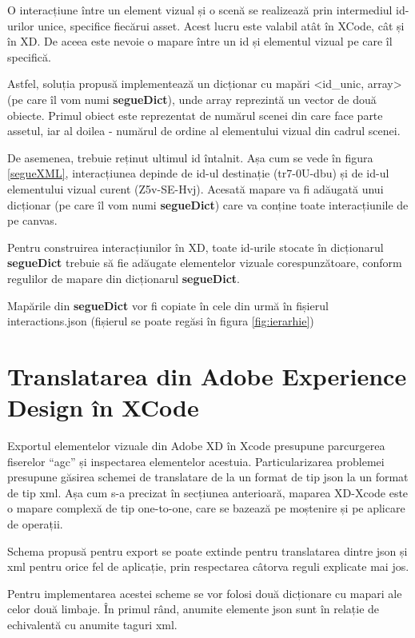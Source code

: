 O interacțiune între un element vizual și o scenă se realizează prin intermediul id-urilor unice, specifice fiecărui asset. Acest lucru este valabil atât în XCode, cât și în XD. De aceea este nevoie o mapare între un id și elementul vizual pe care îl specifică. 

Astfel, soluția propusă implementează un dicționar cu mapări <id_unic, array> (pe care îl vom numi \textbf{segueDict}), unde array reprezintă un vector de două obiecte. Primul obiect este reprezentat de numărul scenei din care face parte assetul, iar al doilea - numărul de ordine al elementului vizual din cadrul scenei.

De asemenea, trebuie reținut ultimul id întalnit. Așa cum se vede în figura \ref{segueXML}, interacțiunea depinde de id-ul destinație (tr7-0U-dbu) și de id-ul elementului vizual curent (Z5v-SE-Hvj). Acesată mapare va fi adăugată unui dicționar (pe care îl vom numi \textbf{segueDict}) care va conține toate interacțiunile de pe canvas.

Pentru construirea interacțiunilor în XD, toate id-urile stocate în dicționarul \textbf{segueDict} trebuie să fie adăugate elementelor vizuale corespunzătoare, conform regulilor de mapare din dicționarul \textbf{segueDict}.

Mapările din \textbf{segueDict} vor fi copiate în cele din urmă în fișierul interactions.json (fișierul se poate regăsi în figura \ref{fig:ierarhie})

\section{Translatarea din Adobe Experience Design în XCode}

Exportul elementelor vizuale din Adobe XD în Xcode presupune parcurgerea fiserelor “agc”  și inspectarea elementelor acestuia. Particularizarea problemei presupune găsirea schemei de translatare de la un format de tip json la un format de tip xml. Așa cum s-a precizat în secțiunea anterioară, maparea XD-Xcode este o mapare complexă de tip one-to-one, care se bazează pe moștenire și pe aplicare de operații. 

Schema propusă pentru export se poate extinde pentru translatarea dintre json și xml pentru orice fel de aplicație, prin respectarea câtorva reguli explicate mai jos. 

Pentru implementarea acestei scheme se vor folosi două dicționare cu mapari ale celor două limbaje.  În primul rând, anumite elemente json sunt în relație de echivalentă cu anumite taguri xml. 


